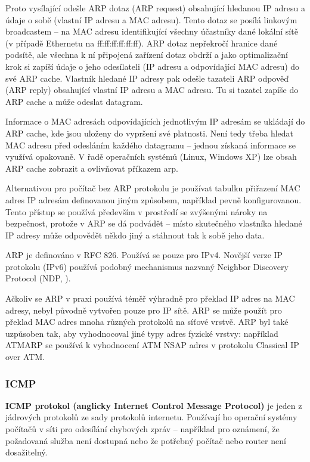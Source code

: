 Proto vysílající odešle ARP dotaz (ARP request) obsahující hledanou IP adresu a údaje o sobě (vlastní IP adresu a MAC adresu). Tento dotaz se posílá linkovým broadcastem – na MAC adresu identifikující všechny účastníky dané lokální sítě (v případě Ethernetu na ff:ff:ff:ff:ff:ff). ARP dotaz nepřekročí hranice dané podsítě, ale všechna k ní připojená zařízení dotaz obdrží a jako optimalizační krok si zapíší údaje o jeho odesílateli (IP adresu a odpovídající MAC adresu) do své ARP cache. Vlastník hledané IP adresy pak odešle tazateli ARP odpověď (ARP reply) obsahující vlastní IP adresu a MAC adresu. Tu si tazatel zapíše do ARP cache a může odeslat datagram.

Informace o MAC adresách odpovídajících jednotlivým IP adresám se ukládají do ARP cache, kde jsou uloženy do vypršení své platnosti. Není tedy třeba hledat MAC adresu před odesláním každého datagramu – jednou získaná informace se využívá opakovaně. V řadě operačních systémů (Linux, Windows XP) lze obsah ARP cache zobrazit a ovlivňovat příkazem arp.

Alternativou pro počítač bez ARP protokolu je používat tabulku přiřazení MAC adres IP adresám definovanou jiným způsobem, například pevně konfigurovanou. Tento přístup se používá především v prostředí se zvýšenými nároky na bezpečnost, protože v ARP se dá podvádět – místo skutečného vlastníka hledané IP adresy může odpovědět někdo jiný a stáhnout tak k sobě jeho data.

ARP je definováno v RFC 826. Používá se pouze pro IPv4. Novější verze IP protokolu (IPv6) používá podobný mechanismus nazvaný Neighbor Discovery Protocol (NDP, ).

Ačkoliv se ARP v praxi používá téměř výhradně pro překlad IP adres na MAC adresy, nebyl původně vytvořen pouze pro IP sítě. ARP se může použít pro překlad MAC adres mnoha různých protokolů na síťové vrstvě. ARP byl také uzpůsoben tak, aby vyhodnocoval jiné typy adres fyzické vrstvy: například ATMARP se používá k vyhodnocení ATM NSAP adres v protokolu Classical IP over ATM.

\subsubsection*{ICMP}

\textbf{ICMP protokol (anglicky Internet Control Message Protocol)} je jeden z jádrových protokolů ze sady protokolů internetu. Používají ho operační systémy počítačů v síti pro odesílání chybových zpráv -- například pro oznámení, že požadovaná služba není dostupná nebo že potřebný počítač nebo router není dosažitelný.


